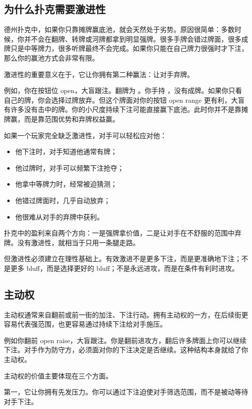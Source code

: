 \subsection{为什么扑克需要激进性}

德州扑克中，如果你只靠摊牌赢底池，就会天然处于劣势。原因很简单：多数时候，你并不会在翻牌、转牌或河牌都拿到明显强牌。很多手牌会错过牌面，很多成牌只是中等牌力，很多听牌最终不会完成。如果你只能在自己牌力很强时才下注，那么你的赢池方式会非常有限。

激进性的重要意义在于，它让你拥有第二种赢法：让对手弃牌。

例如，你在按钮位 open，大盲跟注。翻牌为 。你手持 ，没有成牌。如果你只看自己的牌，你会选择过牌放弃。但这个牌面对你的按钮 open range 更有利，大盲有许多没有击中的牌。你的小尺度持续下注可能直接赢下底池。此时你并不是靠摊牌赢，而是靠范围优势和弃牌权益赢。

如果一个玩家完全缺乏激进性，对手可以轻松应对他：

\begin{itemize}
\item 他下注时，对手知道他通常有牌；
\item 他过牌时，对手可以频繁下注抢夺；
\item 他拿中等牌力时，经常被迫猜测；
\item 他错过牌面时，几乎自动放弃；
\item 他很难从对手的弃牌中获利。
\end{itemize}

扑克中的盈利来自两个方向：一是强牌拿价值，二是让对手在不舒服的范围中弃牌。没有激进性，就相当于只用一条腿走路。

但激进性必须建立在理性基础上。有效激进不是更多下注，而是更准确地下注；不是更多 bluff，而是选择更好的 bluff；不是永远进攻，而是在条件有利时进攻。

\subsection{主动权}

主动权通常来自翻前或前一街的加注、下注行动。拥有主动权的一方，在后续街更容易代表强范围，也更容易通过持续下注给对手施压。

例如你翻前 open raise，大盲跟注。你是翻前进攻方，翻后许多牌面上你可以继续下注。对手作为防守方，必须面对你的下注决定是否继续。这种结构本身就给了你主动权。

主动权的价值主要体现在三个方面。

第一，它让你拥有先发压力。你可以通过下注迫使对手筛选范围，而不是被动等待对手下注。

